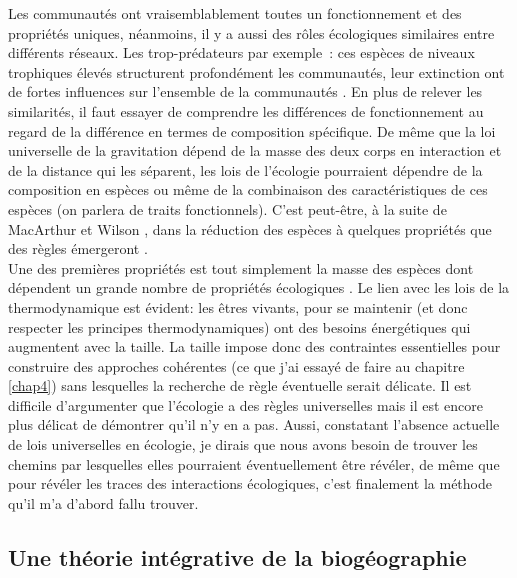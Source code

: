 Les communautés ont vraisemblablement toutes un fonctionnement et des
propriétés uniques, néanmoins, il y a aussi des rôles écologiques
similaires entre différents réseaux. Les trop-prédateurs par exemple~:
ces espèces de niveaux trophiques élevés structurent profondément les
communautés, leur extinction ont de fortes influences sur l'ensemble de
la communautés
\citep{Terborgh2001, Sinclair2003a, Myers2007, Ripple2014}. En plus de
relever les similarités, il faut essayer de comprendre les différences
de fonctionnement au regard de la différence en termes de composition
spécifique. De même que la loi universelle de la gravitation dépend de
la masse des deux corps en interaction et de la distance qui les
séparent, les lois de l'écologie pourraient dépendre de la composition
en espèces ou même de la combinaison des caractéristiques de ces espèces
(on parlera de traits fonctionnels). C'est peut-être, à la suite de
MacArthur et Wilson \citep{MacArthur1967}, dans la réduction des espèces
à quelques propriétés que des règles émergeront
\citep{McGill2006, Poisot2015}.\\
Une des premières propriétés est tout simplement la masse des espèces
dont dépendent un grande nombre de propriétés écologiques
\citep{Woodward2005a}. Le lien avec les lois de la thermodynamique est
évident: les êtres vivants, pour se maintenir (et donc respecter les
principes thermodynamiques) ont des besoins énergétiques qui augmentent
avec la taille. La taille impose donc des contraintes essentielles pour
construire des approches cohérentes (ce que j'ai essayé de faire au
chapitre \ref{chap4}) sans lesquelles la recherche de règle éventuelle
serait délicate. Il est difficile d'argumenter que l'écologie a des
règles universelles mais il est encore plus délicat de démontrer qu'il
n'y en a pas. Aussi, constatant l'absence actuelle de lois universelles
en écologie, je dirais que nous avons besoin de trouver les chemins par
lesquelles elles pourraient éventuellement être révéler, de même que
pour révéler les traces des interactions écologiques, c'est finalement
la méthode qu'il m'a d'abord fallu trouver.

\subsection*{Une théorie intégrative de la
biogéographie}\label{une-thuxe9orie-intuxe9grative-de-la-bioguxe9ographie}

